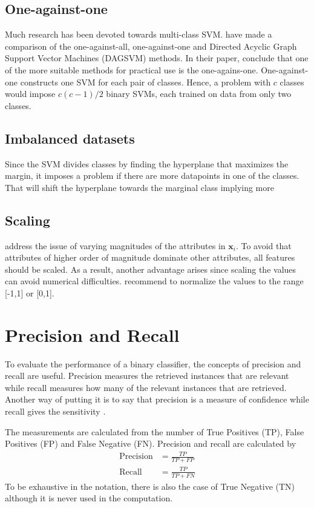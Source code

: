 \subsection{One-against-one}
Much research has been devoted towards multi-class SVM. \citet{Hsu2002} have made a comparison of the one-against-all, one-against-one and Directed Acyclic Graph Support Vector Machines (DAGSVM) methods. In their paper, \citet{Hsu2002} conclude that one of the more suitable methods for practical use is the one-agains-one. One-against-one constructs one SVM for each pair of classes. Hence, a problem with $c$ classes would impose $c(c-1)/2$ binary SVMs, each trained on data from only two classes.

\subsection{Imbalanced datasets}
Since the SVM divides classes by finding the hyperplane that maximizes the margin, it imposes a problem if there are more datapoints in one of the classes. That will shift the hyperplane towards the marginal class implying more 

\subsection{Scaling \label{scale}}
\citet{Hsu10apractical} address the issue of varying magnitudes of the attributes in $\bm{x}_i$. To avoid that attributes of higher order of magnitude dominate other attributes, all features should be scaled. As a result, another advantage arises since scaling the values can avoid numerical difficulties. \citet{Hsu10apractical} recommend to normalize the values to the range [-1,1] or [0,1].

\section{Precision and Recall}
To evaluate the performance of a binary classifier, the concepts of precision and recall are useful. Precision measures the retrieved instances that are relevant while recall measures how many of the relevant instances that are retrieved. Another way of putting it is to say that precision is a measure of confidence while recall gives the sensitivity \citep{powers2011}.

The measurements are calculated from the number of True Positives (TP), False Positives (FP) and False Negative (FN). Precision and recall are calculated by \citep{powers2011}
\begin{align}
\text{Precision}&=\frac{TP}{TP+FP}\\
\text{Recall}&=\frac{TP}{TP+FN}
\end{align}
To be exhaustive in the notation, there is also the case of True Negative (TN) although it is never used in the computation.

